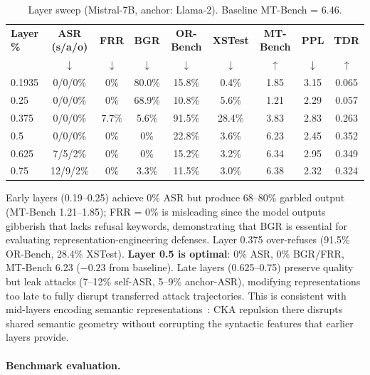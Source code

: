 \begin{table}[ht]
\centering
\caption{Layer sweep (Mistral-7B, anchor: Llama-2). Baseline MT-Bench = 6.46.}
\label{tab:layer_sweep}
\begin{tabular}{@{}lcccccccc@{}}
\toprule
\textbf{Layer \%} & \textbf{ASR (s/a/o)} & \textbf{FRR} & \textbf{BGR} & \textbf{OR-Bench} & \textbf{XSTest} & \textbf{MT-Bench} & \textbf{PPL} & \textbf{TDR} \\
 & $\downarrow$ & $\downarrow$ & $\downarrow$ & $\downarrow$ & $\downarrow$ & $\uparrow$ & $\downarrow$ & $\uparrow$ \\
\midrule
0.1935 & 0/0/0\%  & 0\% & 80.0\% & 15.8\% & 0.4\% & 1.85 & 3.15 & 0.065 \\
0.25   & 0/0/0\%  & 0\% & 68.9\% & 10.8\% & 5.6\% & 1.21 & 2.29 & 0.057 \\
0.375  & 0/0/0\%  & 7.7\%        & 5.6\%  & 91.5\% & 28.4\% & 3.83 & 2.83 & 0.263 \\
0.5    & 0/0/0\%  & 0\% & 0\% & 22.8\% & 3.6\% & 6.23 & 2.45 & 0.352 \\
0.625  & 7/5/2\%           & 0\% & 0\% & 15.2\% & 3.2\% & 6.34 & 2.95 & 0.349 \\
0.75   & 12/9/2\%          & 0\% & 3.3\%  & 11.5\% & 3.0\% & 6.38 & 2.32 & 0.324 \\
\bottomrule
\end{tabular}
\end{table}

Early layers (0.19--0.25) achieve 0\% ASR but produce 68--80\% garbled output (MT-Bench 1.21--1.85); FRR = 0\% is misleading since the model outputs gibberish that lacks refusal keywords, demonstrating that BGR is essential for evaluating representation-engineering defenses. Layer 0.375 over-refuses (91.5\% OR-Bench, 28.4\% XSTest). \textbf{Layer 0.5 is optimal}: 0\% ASR, 0\% BGR/FRR, MT-Bench 6.23 ($-0.23$ from baseline). Late layers (0.625--0.75) preserve quality but leak attacks (7--12\% self-ASR, 5--9\% anchor-ASR), modifying representations too late to fully disrupt transferred attack trajectories. This is consistent with mid-layers encoding semantic representations~\citep{tenney2019bert,geva2022transformer}: CKA repulsion there disrupts shared semantic geometry without corrupting the syntactic features that earlier layers provide.

\paragraph{Benchmark evaluation.}

